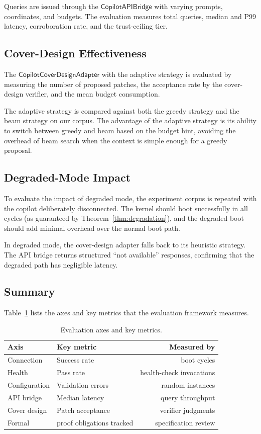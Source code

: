 \documentclass[11pt]{article}
\newcommand{\CAB}{\mathsf{CopilotAPIBridge}}
\newcommand{\CCD}{\mathsf{CopilotCoverDesignAdapter}}
\begin{document}
Queries are issued through the $\CAB$
with varying prompts, coordinates, and budgets.  The evaluation
measures total queries, median and P99 latency, corroboration rate,
and the trust-ceiling tier.

\subsection{Cover-Design Effectiveness}

The $\CCD$ with the adaptive strategy is evaluated by
measuring the number of proposed patches, the acceptance rate by
the cover-design verifier, and the mean budget consumption.

The adaptive strategy is compared against both the greedy strategy
and the beam strategy on our corpus.  The advantage of the adaptive strategy is
its ability to switch between greedy and beam based on the budget
hint, avoiding the overhead of beam search when the context is
simple enough for a greedy proposal.

\subsection{Degraded-Mode Impact}

To evaluate the impact of degraded mode, the experiment
corpus is repeated with the copilot deliberately disconnected.  The kernel
should boot successfully in all cycles (as
guaranteed by Theorem~\ref{thm:degradation}), and the degraded
boot should add minimal overhead over the normal boot path.

In degraded mode, the cover-design adapter falls back to its
heuristic strategy.  The API
bridge returns structured ``not available'' responses,
confirming that the degraded path has negligible latency.

\subsection{Summary}

Table~\ref{tab:exp-summary} lists the axes and key metrics
that the evaluation framework measures.

\begin{table}[t]
\centering
\caption{Evaluation axes and key metrics.}
\label{tab:exp-summary}
\begin{tabular}{@{}llr@{}}
\toprule
Axis & Key metric & Measured by \\
\midrule
Connection     & Success rate           & boot cycles \\
Health         & Pass rate              & health-check invocations \\
Configuration  & Validation errors      & random instances \\
API bridge     & Median latency         & query throughput \\
Cover design   & Patch acceptance       & verifier judgments \\
Formal         & proof obligations tracked & specification review \\
\bottomrule
\end{tabular}
\end{table}
\end{document}
